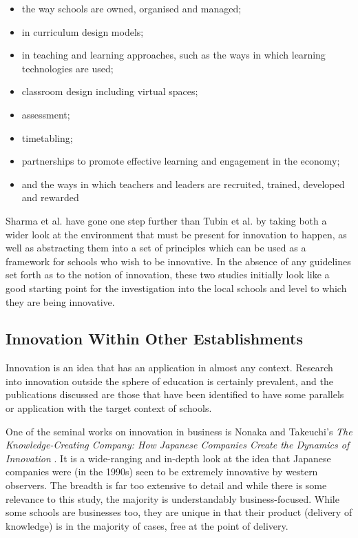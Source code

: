 \begin{itemize}
\item the way schools are owned, organised and managed; 
\item in curriculum design models; 
\item in teaching and learning approaches, such as the ways in which learning technologies are used; 
\item classroom design including virtual spaces; 
\item assessment; 
\item timetabling; 
\item partnerships to promote effective learning and engagement in the economy; 
\item and the ways in which teachers and leaders are recruited, trained, developed and rewarded
\end{itemize}

Sharma et al. have gone one step further than Tubin et al. by taking both a wider look at the environment that must be present for innovation to happen, as well as abstracting them into a set of principles which can be used as a framework for schools who wish to be innovative. In the absence of any guidelines set forth as to the notion of innovation, these two studies initially look like a good starting point for the investigation into the local schools and level to which they are being innovative.

\subsection{Innovation Within Other Establishments}
Innovation is an idea that has an application in almost any context. Research into innovation outside the sphere of education is certainly prevalent, and the publications discussed are those that have been identified to have some parallels or application with the target context of schools.

One of the seminal works on innovation in business is Nonaka and Takeuchi's \textit{The Knowledge-Creating Company: How Japanese Companies Create the Dynamics of Innovation} \citet{nonaka1995knowledge}. It is a wide-ranging and in-depth look at the idea that Japanese companies were (in the 1990s) seen to be extremely innovative by western observers. The breadth is far too extensive to detail and while there is some relevance to this study, the majority is understandably business-focused. While some schools are businesses too, they are unique in that their product (delivery of knowledge) is in the majority of cases, free at the point of delivery.

